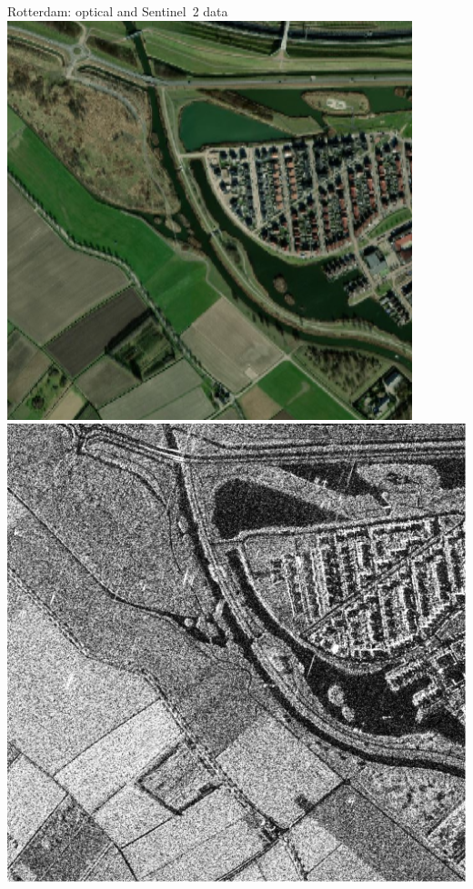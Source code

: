\documentclass[table,aspectratio=169]{beamer}
\begin{document}
{
	\begin{frame}{Rotterdam: optical and Sentinel~2 data}
		\centering
\includegraphics[width=.48\linewidth]{../Figures/PNG/Rotterdam} 
\includegraphics[width=.48\linewidth]{../Figures/PNG/Rotterdam_1024}
	\end{frame}
}
\end{document}
